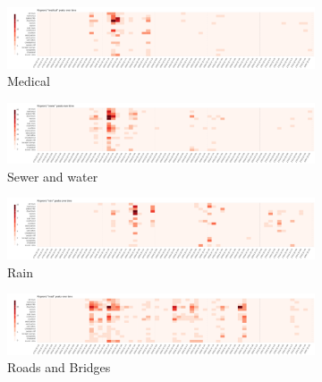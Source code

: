 \begin{figure}[!h]
    \centering
    \begin{subfigure}[!h]{0.96\textwidth}
        \centering
        \includegraphics[width=1.00\textwidth]{figs/q2/medical_2_3_heat.png}
        \caption{Medical}
        \label{fig:medical_2_3_heat}
    \end{subfigure}
    \begin{subfigure}[!h]{0.96\textwidth}
        \centering
        \includegraphics[width=1.00\textwidth]{figs/q2/sewer_2_3_heat.png}
        \caption{Sewer and water}
        \label{fig:sewer_2_3_heat}
    \end{subfigure}
    \begin{subfigure}[!h]{0.96\textwidth}
        \centering
        \includegraphics[width=1.00\textwidth]{figs/q2/rain_2_3_heat.png}
        \caption{Rain}
        \label{fig:rain_2_3_heat}
    \end{subfigure}
    \begin{subfigure}[!h]{0.96\textwidth}
        \centering
        \includegraphics[width=1.00\textwidth]{figs/q2/road_2_3_heat.png}
        \caption{Roads and Bridges}
        \label{fig:roads_2_3_heat}
    \end{subfigure}
    \begin{subfigure}[!h]{0.96\textwidth}
        \centering

\end{subfigure}
\end{figure}

